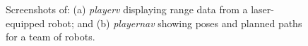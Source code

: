 \begin{figure}[t]
\begin{center}
\caption{Screenshots of: (a) {\em playerv} displaying range data from
a laser-equipped robot; and (b) {\em playernav} showing poses and planned
paths for a team of robots.}
\end{center}
\end{figure}

